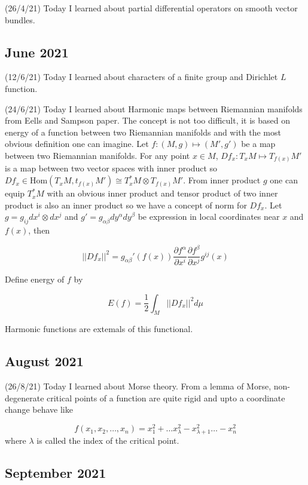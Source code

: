 \documentclass[12pt,a4paper]{article}
\newcommand{\half}{\ensuremath{\frac{1}{2}}}
\begin{document}
  (26/4/21) Today I learned about partial differential operators on smooth vector bundles.
  
  \subsection*{June 2021}
  
 
  \quad (12/6/21) Today I learned about characters of a finite group and Dirichlet $L$ function.
  
  (24/6/21) Today I learned about Harmonic maps between Riemannian manifolds from Eells and Sampson paper. The concept is not too difficult, it is based on energy of a function between two Riemannian manifolds and with the most obvious definition one can imagine. Let $f :(M,g)\mapsto (M',g')$ be a map between two Riemannian manifolds. For any point $x \in M$, $Df_x :T_xM \mapsto T_{f(x)}M'$ is a map between two vector spaces with inner product so $Df_x \in \text{Hom}(T_xM,t_{f(x)}M')  \cong T^*_xM \otimes T_{f(x)}M'$. From inner product $g$ one can equip $T_x^*M$ with an obvious inner product and tensor product of two inner product is also an inner product so we have a concept of norm for $Df_x$. Let $g = g_{ij}dx^i\otimes dx^j$ and $g' = g_{\alpha \beta}dy^\alpha dy^\beta $ be expression in local coordinates near $x$ and $f(x)$, then 
  
  \[ ||Df_x||^2 = g_{\alpha \beta }'(f(x))\frac{\partial f^\alpha}{\partial x^i}\frac{\partial f^\beta}{\partial x^j}g^{ij}(x) \]
  
  Define energy of $f$ by 
  
  \[ E(f) = \half \int_M ||Df_x||^2d\mu \]
  
  Harmonic functions are extemals of this functional.
  
  \subsection*{August 2021}
  
  \quad (26/8/21) Today I learned about Morse theory. From a lemma of Morse, non-degenerate critical points of a function are quite rigid and upto a coordinate change behave like 
  
  \[ f(x_1,x_2,\ldots,x_n) = x_1^2 + \ldots x_\lambda^2 - x_{\lambda+1}^2 \ldots - x_n^2 \]
   where $\lambda$ is called the index of the critical point.
   
\subsection*{September 2021}
   
\end{document}

